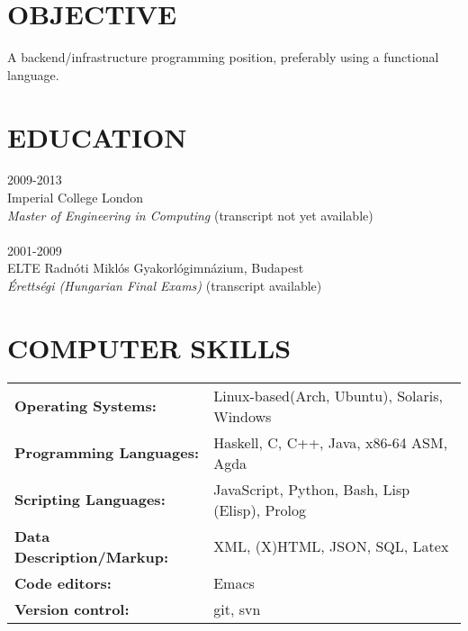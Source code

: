 \documentclass[11pt]{res} %
\begin{document}
 

\address{{\bf PRESENT ADDRESS}\\
  31 Princess Court\\
  London, United Kingdom \\
         W2 4RD}
\address{{\bf PERMANENT ADDRESS} \\ 3/D Bihari utca \\ Budapest, Hungary
         1107 \\ +361 263 3370}

                                             
\begin{resume}
                                               
 
\section{OBJECTIVE}
   A backend/infrastructure programming position, preferably using a functional language.
 
\section{EDUCATION}
2009-2013\\
Imperial College London\\
\emph{Master of Engineering in Computing} (transcript not yet available)
\\
\\
2001-2009\\
ELTE Radnóti Miklós Gyakorlógimnázium, Budapest\\
\emph{Érettségi (Hungarian Final Exams)} (transcript available)

\section{COMPUTER SKILLS}
\begin{tabular}{ll}
\bf{Operating Systems}: & {Linux-based(Arch, Ubuntu), Solaris, Windows}\\
\bf{Programming Languages}: & {Haskell, C, C++, Java, x86-64 ASM, Agda}\\
\bf{Scripting Languages}: & {JavaScript, Python, Bash, Lisp (Elisp), Prolog}\\
\bf{Data Description/Markup}: & {XML, (X)HTML, JSON, SQL, Latex}\\
\bf{Code editors}: & {Emacs}\\
\bf{Version control}: & {git, svn}
\end{tabular}


\end{resume}
\end{document}
